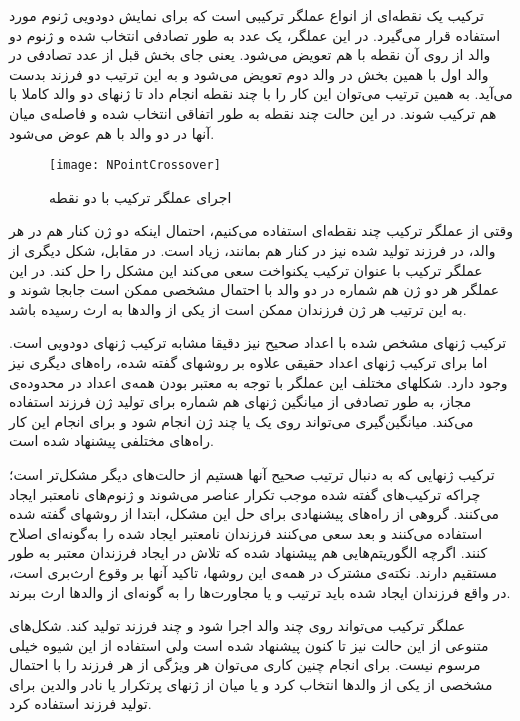 \documentclass{report}
\begin{document}
ترکیب یک نقطه‌ای از انواع عملگر ترکیبی است که برای نمایش دودویی ژنوم مورد استفاده قرار می‌گیرد. در این عملگر، یک عدد به طور تصادفی انتخاب شده و ژنوم دو والد از روی آن نقطه با هم تعویض می‌شود. یعنی جای بخش قبل از عدد تصادفی در والد اول با همین بخش در والد دوم تعویض می‌شود و به این ترتیب دو فرزند بدست می‌آید. به همین ترتیب می‌توان این کار را با چند نقطه انجام داد تا ژنهای دو والد کاملا با هم ترکیب شوند. در این حالت چند نقطه به طور اتفاقی انتخاب شده و فاصله‌ی میان آنها در دو والد با هم عوض می‌شود.

\begin{figure} \centerline{\texttt{[image: NPointCrossover]}} \caption{\label{fNPointCrossover}
 اجرای عملگر ترکیب با دو نقطه
 } \end{figure}
 
وقتی از عملگر ترکیب چند نقطه‌ای استفاده می‌کنیم، احتمال اینکه دو ژن کنار هم در هر والد، در فرزند تولید شده نیز در کنار هم بمانند، زیاد است. در مقابل، شکل دیگری از عملگر ترکیب با عنوان ترکیب یکنواخت سعی می‌کند این مشکل را حل کند. در این عملگر هر دو ژن هم شماره در دو والد با احتمال مشخصی ممکن است جابجا شوند و به این ترتیب هر ژن فرزندان ممکن است از یکی از والدها به ارث رسیده باشد.

ترکیب ژنهای مشخص شده با اعداد صحیح نیز دقیقا مشابه ترکیب ژنهای دودویی است. اما برای ترکیب ژنهای اعداد حقیقی علاوه بر روشهای گفته شده، راه‌های دیگری نیز وجود دارد. شکلهای مختلف این عملگر با توجه به معتبر بودن همه‌ی اعداد در محدوده‌ی مجاز، به طور تصادفی از میانگین ژنهای هم شماره برای تولید ژن فرزند استفاده می‌کند. میانگین‌گیری می‌تواند روی یک یا چند ژن انجام شود و برای انجام این کار راه‌های مختلفی پیشنهاد شده است.

ترکیب ژنهایی که به دنبال ترتیب صحیح آنها هستیم از حالت‌های دیگر مشکل‌تر است؛ چراکه ترکیب‌های گفته شده موجب تکرار عناصر می‌شوند و ژنوم‌های نامعتبر ایجاد می‌کنند. گروهی از راه‌های پیشنهادی برای حل این مشکل، ابتدا از روشهای گفته شده استفاده می‌کنند و بعد سعی می‌کنند فرزندان نامعتبر ایجاد شده را به‌گونه‌ای اصلاح کنند. اگرچه الگوریتم‌هایی هم پیشنهاد شده که تلاش در ایجاد فرزندان معتبر به طور مستقیم دارند. نکته‌ی مشترک در همه‌ی این روشها، تاکید آنها بر وقوع ارث‌بری است، در واقع فرزندان ایجاد شده باید ترتیب و یا مجاورت‌ها را به گونه‌ای از والد‌ها ارث ببرند.

عملگر ترکیب می‌تواند روی چند والد اجرا شود و چند فرزند تولید کند. شکل‌های متنوعی از این حالت نیز تا کنون پیشنهاد شده است ولی استفاده از این شیوه خیلی مرسوم نیست. برای انجام چنین کاری می‌توان هر ویژگی از هر فرزند را با احتمال مشخصی از یکی از والدها انتخاب کرد و یا میان از ژنهای پرتکرار یا نادر والدین برای تولید فرزند استفاده کرد.
\end{document}
